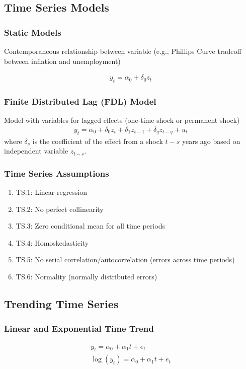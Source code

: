 \documentclass[12pt]{article}
\numberwithin{equation}{section}
\begin{document}
\subsection{Time Series Models}

\subsubsection{Static Models}
Contemporaneous relationship between variable (e.g., Phillips Curve tradeoff between inflation and unemployment)

\begin{gather}
    y_t = \alpha_0 + \delta_0 z_t
\end{gather}

\subsubsection{Finite Distributed Lag (FDL) Model}
Model with variables for lagged effects (one-time shock or permanent shock)
\begin{gather}
    y_t = \alpha_0 + \delta_0 z_{t} + \delta_1 z_{t-1} + \delta_q z_{t-q} + u_t
\end{gather}
where $\delta_{s}$ is the coefficient of the effect from a shock $t-s$ years ago based on independent variable $z_{t-s}$.

\subsubsection{Time Series Assumptions}
\begin{enumerate}
    \item TS.1: Linear regression
    \item TS.2: No perfect collinearity
    \item TS.3: Zero conditional mean for all time periods
    \item TS.4: Homoskedasticity
    \item TS.5: No serial correlation/autocorrelation (errors across time periods)
    \item TS.6: Normality (normally distributed errors)
\end{enumerate}

\subsection{Trending Time Series}

\subsubsection{Linear and Exponential Time Trend}
\begin{gather}
    y_t = \alpha_0 + \alpha_1 t + e_t \\
    \log(y_t) = \alpha_0 + \alpha_1 t + e_t
\end{gather}
\end{document}
